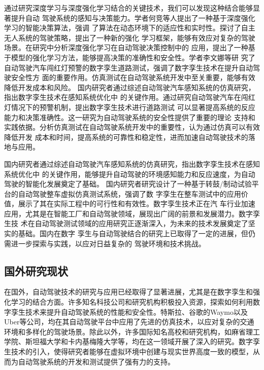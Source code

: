 通过研究深度学习与深度强化学习结合的关键技术，我们可以发现这种结合能够显著提升自动
驾驶系统的感知与决策能力。学者何竞等人提出了一种基于深度强化学习的智能决策算法，强调
了算法在动态环境下的适应性和实时性。探讨了自主无人系统的驾驶策略，提出了一种新的强化
学习框架，能够有效应对复杂的驾驶场景。在研究中分析深度强化学习在自动驾驶决策控制中的
应用，提出了一种基于模型的强化学习方法，能够提高决策的准确性和安全性。学者李文娜\cite{李文娜2024自动驾驶汽车闯红灯预警数字孪生道路测试}等研
究了自动驾驶汽车闯红灯预警的数字孪生道路测试，强调了数字孪生技术在提升自动驾驶安全性方
面的重要作用。仿真测试在自动驾驶系统开发中至关重要，能够有效降低开发成本和风险。
国内研究者通过综述自动驾驶汽车感知系统的仿真研究，指出数字孪生技术在感知系统优化中
的关键作用。通过研究自动驾驶汽车在闯红灯情况下的预警机制，提出数字孪生技术进行道路测试
可以显著提高系统的反应能力和决策准确性。这一研究为自动驾驶系统的安全性提供了重要的理论
支持和实践依据。分析仿真测试在自动驾驶系统开发中的重要性，认为通过仿真可以有效降低开发
成本和时间，提高系统的可靠性和稳定性，进而加速自动驾驶技术的落地与应用\cite{杨海清2024仿真测试在自动驾驶系统开发中的重要性}。

国内研究者通过综述自动驾驶汽车感知系统的仿真研究，指出数字孪生技术在感知系统优化中
的关键作用，能够提升自动驾驶的环境感知能力和反应速度，为自动驾驶的智能化发展奠定了基础\cite{杨海清2024仿真测试在自动驾驶系统开发中的重要性}。
国内研究者研究设计了一种基于转鼓/制动试验平台的自动驾驶整车虚拟仿真测试系统\cite{田常青2024基于转鼓}，强调了数
字孪生在整车测试中的应用价值，展示了其在实际工程中的可行性和有效性。数字孪生技术正在汽
车行业加速应用，尤其是在智能工厂和自动驾驶领域，展现出广阔的前景和发展潜力\cite{高驰2023智能工厂}。数字孪生技
术在自动驾驶测试领域的应用研究正逐渐深入，为未来的技术发展奠定了坚实的基础。国内在数字
孪生与自动驾驶结合的研究上已取得了一定的进展，但仍需进一步探索与实践，以应对日益复杂的
驾驶环境和技术挑战。

\subsection{国外研究现状}
在国外，自动驾驶技术的研究与应用已经取得了显著进展，尤其是在数字孪生和强化学习的结合方面。许多知名科技公司和研究机构积极投入资源，探索如何利用数字孪生技术来提升自动驾驶系统的性能和安全性。特斯拉、谷歌的Waymo以及Uber等公司，均在其自动驾驶平台中应用了先进的仿真技术，以应对复杂的交通环境和多样化的驾驶场景。除此以外，许多国际知名高校和研究机构，如麻省理工学院、斯坦福大学和卡内基梅隆大学等，均在这一领域开展了深入的研究。数字孪生技术的引入，使得研究者能够在虚拟环境中创建与现实世界高度一致的模型，从而为自动驾驶系统的开发和测试提供了强有力的支持。

